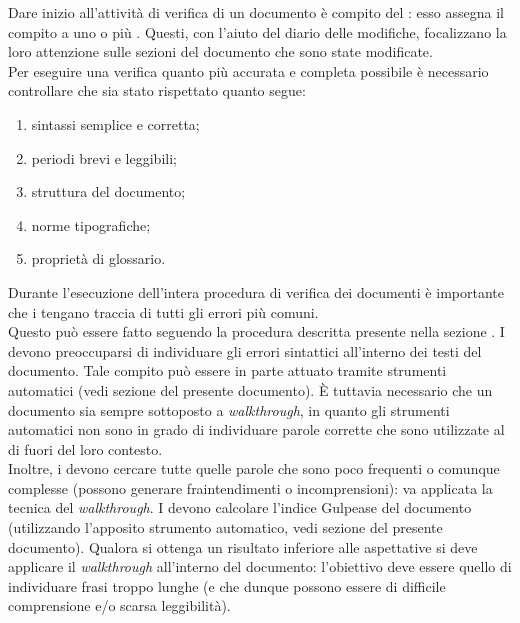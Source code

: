 					Dare inizio all'attività di verifica di un documento è compito del : esso assegna il compito a uno o più . Questi, con l'aiuto del diario delle modifiche, focalizzano la loro attenzione sulle sezioni del documento che sono state modificate.\\
Per eseguire una verifica quanto più accurata e completa possibile è necessario controllare che sia stato rispettato quanto segue:
					\begin{enumerate}
						\item sintassi semplice e corretta;
						\item periodi brevi e leggibili;
						\item struttura del documento;
						\item norme tipografiche;
						\item proprietà di glossario.
					\end{enumerate}
					Durante l'esecuzione dell'intera procedura di verifica dei documenti è importante che i  tengano traccia di tutti gli errori più comuni.\\ Questo può essere fatto seguendo la procedura descritta presente nella sezione .
						I  devono preoccuparsi di individuare gli errori sintattici all'interno dei testi del documento. Tale compito può essere in parte attuato tramite strumenti automatici (vedi sezione  del presente documento). È tuttavia necessario che un documento sia sempre sottoposto a \textit{walkthrough}, in quanto gli strumenti automatici non sono in grado di individuare parole corrette che sono utilizzate al di fuori del loro contesto.\\ Inoltre, i  devono cercare tutte quelle parole che sono poco frequenti o comunque complesse (possono generare fraintendimenti o incomprensioni): va applicata la tecnica del \textit{walkthrough}.
						I  devono calcolare l'indice Gulpease del documento (utilizzando l'apposito strumento automatico, vedi sezione  del presente documento). Qualora si ottenga un risultato inferiore alle aspettative si deve applicare il \textit{walkthrough} all'interno del documento: l'obiettivo deve essere quello di individuare frasi troppo lunghe (e che dunque possono essere di difficile comprensione e/o scarsa leggibilità).
